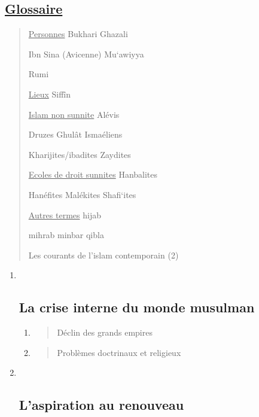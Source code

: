 \hypertarget{glossaire}{%
\subsection{\texorpdfstring{\underline{Glossaire}}{Glossaire}}\label{glossaire}}

\begin{quote}
\underline{Personnes} Bukhari Ghazali

Ibn Sina (Avicenne) Mu`awiyya

Rumi

\underline{Lieux} Siffîn

\underline{Islam non sunnite} Alévis

Druzes Ghulât Ismaéliens

Kharijites/ibadites Zaydites

\underline{Ecoles de droit sunnites} Hanbalites

Hanéfites Malékites Shafi`ites

\underline{Autres termes} hijab

mihrab minbar qibla

Les courants de l'islam contemporain (2)
\end{quote}

\begin{enumerate}
\def\labelenumi{\Roman{enumi}.}
\item ~
  \hypertarget{la-crise-interne-du-monde-musulman}{%
  \subsection{La crise interne du monde
  musulman}\label{la-crise-interne-du-monde-musulman}}

  \begin{enumerate}
  \def\labelenumii{\arabic{enumii}.}
  \item
    \begin{quote}
    Déclin des grands empires
    \end{quote}
  \item
    \begin{quote}
    Problèmes doctrinaux et religieux
    \end{quote}
  \end{enumerate}
\item ~
  \hypertarget{laspiration-au-renouveau}{%
  \subsection{L'aspiration au
  renouveau}\label{laspiration-au-renouveau}}
\end{enumerate}

